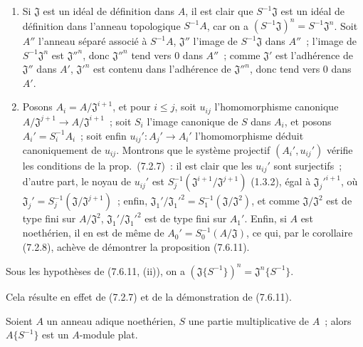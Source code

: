 \begin{enumerate}
  \item[\rm(i)] Si $\mathfrak J$ est un idéal de définition dans $A$, il est
    clair que $S^{-1}\mathfrak J$ est un idéal de définition dans l'anneau
    topologique $S^{-1}A$, car on a
    $(S^{-1}\mathfrak J)^n=S^{-1}\mathfrak J^n$. Soit $A''$ l'anneau séparé
    associé à $S^{-1}A$, $\mathfrak J''$ l'image de $S^{-1}\mathfrak J$ dans
    $A''$~; l'image de $S^{-1}\mathfrak J^n$ est $\mathfrak J''^n$, donc
    $\mathfrak J''^n$ tend vers 0 dans $A''$~; comme $\mathfrak J'$ est
    l'adhérence de $\mathfrak J''$ dans $A'$, $\mathfrak J'^n$ est contenu
    dans l'adhérence de $\mathfrak J''^n$, donc tend vers 0 dans $A'$.
  \item[\rm(ii)] Posons $A_i=A/\mathfrak J^{i+1}$, et pour $i\leq j$, soit
    $u_{ij}$ l'homomorphisme canonique
    $A/\mathfrak J^{j+1}\to A/\mathfrak J^{i+1}$~; soit $S_i$ l'image
    canonique de $S$ dans $A_i$, et posons $A_i'=S_i^{-1}A_i$~; soit enfin
    $u_{ij}':A_j'\to A_i'$ l'homomorphisme déduit canoniquement de $u_{ij}$.
    Montrons que le système projectif $(A_i',u_{ij}')$ vérifie les conditions
    de la prop.~(7.2.7)~: il est clair que les $u_{ij}'$ sont surjectifs~;
    d'autre part, le noyau de $u_{ij}'$ est
    $S_j^{-1}(\mathfrak J^{i+1}/\mathfrak J^{j+1})$ (1.3.2), égal à
    $\mathfrak J_j'^{i+1}$, où
    $\mathfrak J_j'=S_j^{-1}(\mathfrak J/\mathfrak J^{j+1})$~; enfin,
    $\mathfrak J_1'/\mathfrak J_1'^2=S_1^{-1}(\mathfrak J/\mathfrak J^2)$,
    et comme $\mathfrak J/\mathfrak J^2$ est de type fini sur
    $A/\mathfrak J^2$, $\mathfrak J_1'/\mathfrak J_1'^2$ est de type fini
    sur $A_1'$. Enfin, si $A$ est noethérien, il en est de même de
    $A_0'=S_0^{-1}(A/\mathfrak J)$, ce qui, par le corollaire (7.2.8), achève de démontrer la proposition
    (7.6.11).
\end{enumerate}

\begin{corollary}[7.6.12]
\label{0.7.6.12-fr}
Sous les hypothèses de \textup{(7.6.11, (ii))}, on a
$(\mathfrak J\{S^{-1}\})^n=\mathfrak J^n\{S^{-1}\}$.
\end{corollary}

Cela résulte en effet de (7.2.7) et de la démonstration de (7.6.11).

\begin{proposition}[7.6.13]
\label{0.7.6.13-fr}
Soient $A$ un anneau adique noethérien, $S$ une partie multiplicative de $A$~;
alors $A\{S^{-1}\}$ est un $A$-module plat.
\end{proposition}

